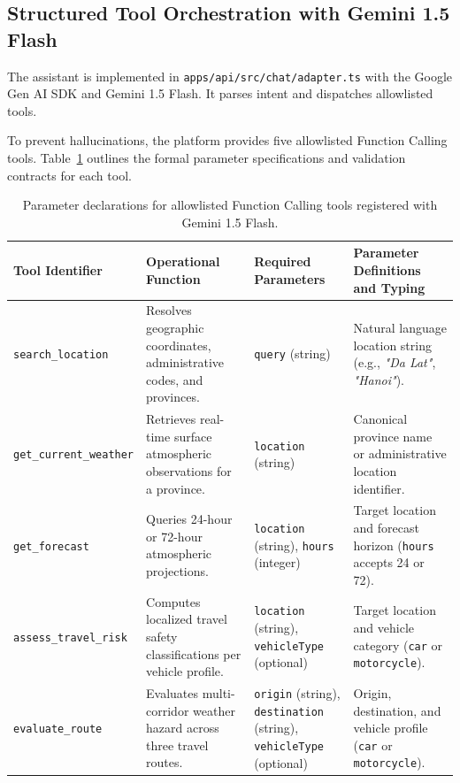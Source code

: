 \subsection{Structured Tool Orchestration with Gemini 1.5 Flash}
The assistant is implemented in \texttt{apps/api/src/chat/adapter.ts} with the Google Gen AI SDK and Gemini 1.5 Flash. It parses intent and dispatches allowlisted tools.

To prevent hallucinations, the platform provides five allowlisted Function Calling tools. Table~\ref{tab:gemini_tool_schema_en} outlines the formal parameter specifications and validation contracts for each tool.

\begin{table}[H]
\centering
\small
\caption[Allowlisted Gemini Function Calling tool specifications]{Parameter declarations for allowlisted Function Calling tools registered with Gemini 1.5 Flash.}
\label{tab:gemini_tool_schema_en}
\begin{tabularx}{\textwidth}{l >{\raggedright\arraybackslash}p{3.4cm} >{\raggedright\arraybackslash}p{2.8cm} X}
\toprule
\textbf{Tool Identifier} & \textbf{Operational Function} & \textbf{Required Parameters} & \textbf{Parameter Definitions and Typing} \\
\midrule
\texttt{search\_location} & Resolves geographic coordinates, administrative codes, and provinces. & \texttt{query} (string) & Natural language location string (e.g., \textit{"Da Lat"}, \textit{"Hanoi"}). \\
\addlinespace
\texttt{get\_current\_weather} & Retrieves real-time surface atmospheric observations for a province. & \texttt{location} (string) & Canonical province name or administrative location identifier. \\
\addlinespace
\texttt{get\_forecast} & Queries 24-hour or 72-hour atmospheric projections. & \texttt{location} (string), \newline \texttt{hours} (integer) & Target location and forecast horizon (\texttt{hours} accepts 24 or 72). \\
\addlinespace
\texttt{assess\_travel\_risk} & Computes localized travel safety classifications per vehicle profile. & \texttt{location} (string), \newline \texttt{vehicle}\allowbreak\texttt{Type} (optional) & Target location and vehicle category (\texttt{car} or \texttt{motorcycle}). \\
\addlinespace
\texttt{evaluate\_route} & Evaluates multi-corridor weather hazard across three travel routes. & \texttt{origin} (string), \newline \texttt{desti}\allowbreak\texttt{nation} (string), \newline \texttt{vehicle}\allowbreak\texttt{Type} (optional) & Origin, destination, and vehicle profile (\texttt{car} or \texttt{motorcycle}). \\
\bottomrule
\end{tabularx}
\end{table}

